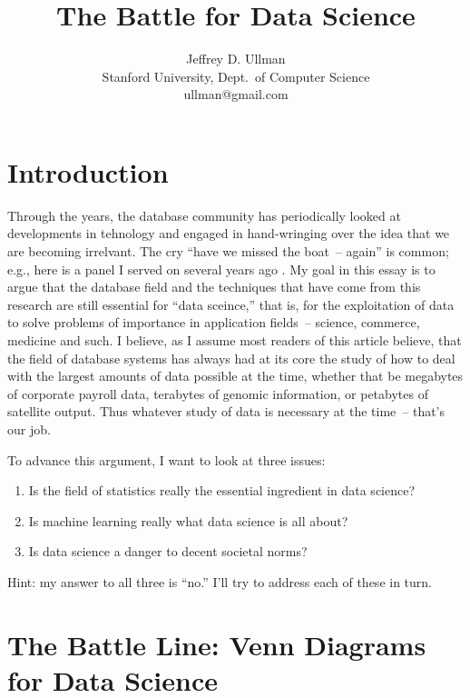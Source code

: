 \documentclass[11pt]{article}
\begin{document}
\title{The Battle for Data Science}
\author{Jeffrey D. Ullman\\Stanford University, Dept.\ of Computer Science\\ullman@gmail.com}


\section{Introduction}

Through the years, the database community has periodically looked at developments in tehnology and engaged in hand-wringing over the idea that we are becoming irrelvant.  The cry ``have we missed the boat~-- again'' is common; e.g., here is a panel I served on several years ago \cite{boat}.
My goal in this essay is to argue that the database field and the techniques that have come from this research are still essential for ``data sceince,'' that is, for the exploitation of data to solve problems of importance in application fields~-- science, commerce, medicine and such.  I believe, as I assume most readers of this article believe, that the field of database systems has always had at its core the study of how to deal with the largest amounts of data possible at the time, whether that be megabytes of corporate payroll data, terabytes of genomic information, or petabytes of satellite output.  Thus whatever study of data is necessary at the time~-- that's our job.

To advance this argument, I want to look at three issues:

\begin{enumerate}

\item
Is the field of statistics really the essential ingredient in data science?

\item
Is machine learning really what data science is all about?

\item
Is data science a danger to decent societal norms?

\end{enumerate}
Hint: my answer to all three is ``no.''  I'll try to address each of these in turn.

\section{The Battle Line: Venn Diagrams for Data Science}
\end{document}
